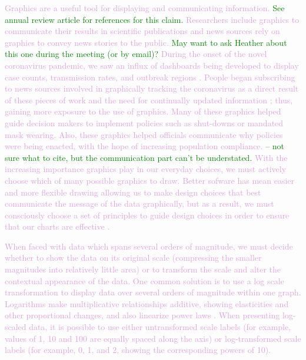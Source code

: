 \documentclass[]{interact}
\theoremstyle{plain}%
\theoremstyle{definition}
\theoremstyle{remark}
\begin{document}
\textcolor{Plum}{Graphics are a useful tool for displaying and communicating information.}
\textcolor{Green}{See annual review article for references for this claim.}
\textcolor{Plum}{Researchers include graphics to communicate their results in scientific publications and news sources rely on graphics to convey news stories to the public.}
\textcolor{Green}{May want to ask Heather about this one during the meeting (or by email)?}
\textcolor{Plum}{During the onset of the novel coronavirus pandemic, we saw an influx of dashboards being developed to display case counts, transmission rates, and outbreak regions \citep{lisa_charlotte_2020}.
People began subscribing to news sources involved in graphically tracking the coronavirus as a direct result of these pieces of work and the need for continually updated information \citep{rost_2020}; thus, gaining more exposure to the use of graphics.}
\textcolor{Plum}{Many of these graphics helped guide decision makers to implement policies such as shut-downs or mandated mask wearing.
Also, these graphics helped officials communicate why policies were being enacted, with the hope of increasing population compliance.}
\textcolor{Green}{-- not sure what to cite, but the communication part can't be understated.}
\textcolor{Plum}{With the increasing importance graphics play in our everyday choices, we must actively choose which of many possible graphics to draw. 
Better sofware has mean easier and more flexible drawing allowing us to make design choices that best communicate the message of the data graphically, but as a result, we must consciously choose a set of principles to guide design choices in order to ensure that our charts are effective \citep{unwin_why_2020}.}

\textcolor{Plum}{
When faced with data which spans several orders of magnitude, we must decide whether to show the data on its original scale (compressing the smaller magnitudes into relatively little area) or to transform the scale and alter the contextual appearance of the data.
One common solution is to use a log scale transformation to display data over several orders of magnitude within one graph.
Logarithms make multiplicative relationships additive, showing elasticities and other proportional changes, and also linearize power laws \citep{menge_logarithmic_2018}. 
When presenting log-scaled data, it is possible to use either untransformed scale labels (for example, values of 1, 10 and 100 are equally spaced along the axis) or log-transformed scale labels (for example, 0, 1, and 2, showing the corresponding powers of 10).
}
\end{document}
